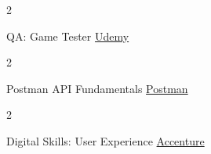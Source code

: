 \documentclass[10pt, letterpaper]{article}
\newenvironment{twocolentry}[2][]{
    \onecolentry
    \def\secondColumn{#2}
    \setcolumnwidth{\fill, 4.5 cm}
    \begin{paracol}{2}
}{
    \switchcolumn \raggedleft \secondColumn
    \end{paracol}
    \endonecolentry
} %
\begin{document}
         \begin{twocolentry}{
            \href{https://www.udemy.com/certificate/UC-8106581b-970b-469f-85af-6839d90170db/}{Udemy}
        }
            {QA: Game Tester}\end{twocolentry}
  
             \begin{twocolentry}{
            \href{https://badgr.com/public/assertions/oWgnPWacQH-tz7XmYdXtVA?identity__email=nagekarsimran@gmail.com}{Postman}
        }
            {Postman API Fundamentals}\end{twocolentry}

            \begin{twocolentry}{
            \href{https://drive.google.com/file/d/1vCxmgVykisle2ym5Ri-oPLEZbpvhcNPK/view}{Accenture}
        }
            Digital Skills: User Experience\end{twocolentry}
\end{document}
